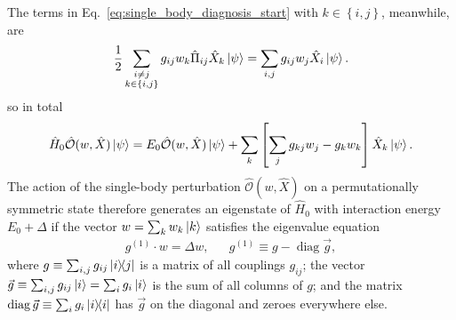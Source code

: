 \documentclass[aps,pra,nofootinbib,twocolumn,superscriptaddress]{revtex4-2}
\newcommand{\f}[2]{\dfrac{#1}{#2}} %
\renewcommand{\sp}[1]{\left[#1\right]} %
\renewcommand{\set}[1]{\left\{#1\right\}} %
\newcommand{\1}{\mathds{1}}
\renewcommand{\H}{\hat{H}}
\renewcommand{\O}{\hat{\mathcal{O}}}
\DeclareMathOperator{\diag}{diag}
\begin{document}
The terms in Eq.~\eqref{eq:single_body_diagnosis_start} with
$k\in\set{i,j}$, meanwhile, are
\begin{align}
  \f12 \sum_{\substack{i\ne j\\k\in\set{i,j}}}
  g_{ij} w_k \hat\Pi_{ij} \hat{X}_k \ket\psi
  = \sum_{i,j} g_{ij} w_j \hat{X}_i \ket\psi.
\end{align}
so in total
\begin{align}
  \H_0 \O(w,\hat{X}) \ket\psi
  = E_0 \O(w,\hat{X}) \ket\psi
  + \sum_k \sp{\sum_j g_{kj} w_j - g_k w_k} \hat{X}_k \ket\psi.
\end{align}
The action of the single-body perturbation $\O(w,\hat{X})$ on a permutationally symmetric state therefore generates an eigenstate of $\H_0$ with interaction energy $E_0+\Delta$ if the vector $w=\sum_k w_k \ket{k}$ satisfies the eigenvalue equation
\begin{align}
  g^{(1)} \cdot w = \Delta w, && g^{(1)} \equiv g - \diag\vec g,
  \label{eq:single_body_eig}
\end{align}
where $g \equiv\sum_{i,j} g_{ij} \op{i}{j}$ is a matrix of all couplings $g_{ij}$; the vector $\vec g \equiv \sum_{i,j} g_{ij} \ket{i} = \sum_i g_i \ket{i}$ is the sum of all columns of $g$; and the matrix $\diag\vec g \equiv \sum_i g_i \op{i}$ has $\vec g$ on the diagonal and zeroes everywhere else.
\end{document}
